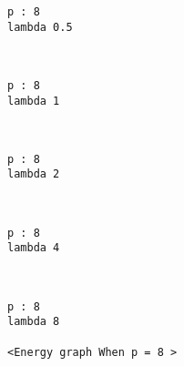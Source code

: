 \documentclass[11pt]{article}
\begin{document}
    \begin{Verbatim}[commandchars=\\\{\}]
p : 8
lambda 0.5

    \end{Verbatim}

    \begin{center}
    \end{center}
    { \hspace*{\fill} \\}
    
    \begin{Verbatim}[commandchars=\\\{\}]
p : 8
lambda 1

    \end{Verbatim}

    \begin{center}
    \end{center}
    { \hspace*{\fill} \\}
    
    \begin{Verbatim}[commandchars=\\\{\}]
p : 8
lambda 2

    \end{Verbatim}

    \begin{center}
    \end{center}
    { \hspace*{\fill} \\}
    
    \begin{Verbatim}[commandchars=\\\{\}]
p : 8
lambda 4

    \end{Verbatim}

    \begin{center}
    \end{center}
    { \hspace*{\fill} \\}
    
    \begin{Verbatim}[commandchars=\\\{\}]
p : 8
lambda 8

<Energy graph When p = 8 >

    \end{Verbatim}
\end{document}
